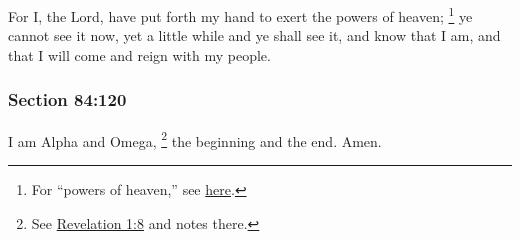 		For I, the Lord, have put forth my hand to exert the powers of heaven;%
			\footnote{%
				For ``powers of heaven,'' see \hyperref[POWER-PHRASES]{here}.
				}
		ye cannot see it now, yet a little while and ye shall see it, and know that I am, and that I will come and reign with my people.


	\subsubsection{Section 84:120} %
		\label{DC84-120}

		I am Alpha and Omega,%
			\footnote{%
				See \hyperref[REVELATIONNT-1-8]{Revelation 1:8} and notes there.
				} 
		the beginning and the end.  Amen.

